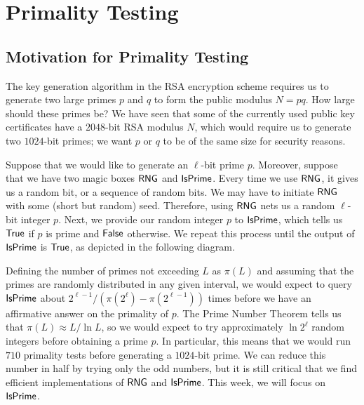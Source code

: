 \section{Primality Testing}

\subsection{Motivation for Primality Testing}
The key generation algorithm in the RSA encryption scheme requires us to generate two large primes $p$
and $q$ to form the public modulus $N = pq$. How large should these primes be? We have seen that 
some of the currently used public key certificates have a $2048$-bit RSA modulus $N$, which would 
require us to generate two $1024$-bit primes; we want $p$ or $q$ to be of the same size for 
security reasons. 

Suppose that we would like to generate an $\ell$-bit prime $p$. Moreover, suppose that we 
have two magic boxes ${\sf RNG}$ and ${\sf IsPrime}$. Every time we use ${\sf RNG}$, it gives us a random bit, 
or a sequence of random bits. We may have to initiate ${\sf RNG}$ with some (short but random) seed. 
Therefore, using ${\sf RNG}$ nets us a random $\ell$-bit integer $p$. Next, we provide our random integer $p$
to ${\sf IsPrime}$, which tells us ${\sf True}$ if $p$ is prime and ${\sf False}$ otherwise. We repeat this 
process until the output of ${\sf IsPrime}$ is ${\sf True}$, as depicted in the following diagram. 

\begin{center}
\end{center}

Defining the number of primes not exceeding $L$ as $\pi(L)$ and assuming that the primes are 
randomly distributed in any given interval, we would expect to query ${\sf IsPrime}$ about 
$2^{\ell-1}/(\pi(2^\ell) - \pi(2^{\ell-1}))$ times before we have an affirmative answer on the primality
of $p$. The Prime Number Theorem tells us that $\pi(L) \approx L/\ln L$, so we would expect to 
try approximately $\ln 2^\ell$ random integers before obtaining a prime $p$. In particular, 
this means that we would run $710$ primality tests before generating a $1024$-bit prime. We can 
reduce this number in half by trying only the odd numbers, but it is still critical that we find 
efficient implementations of ${\sf RNG}$ and ${\sf IsPrime}$. This week, we will focus on ${\sf IsPrime}$. 

